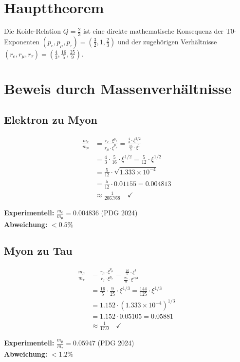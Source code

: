 	\section{Haupttheorem}
	
	\begin{theorem}
		Die Koide-Relation $Q = \frac{2}{3}$ ist eine direkte mathematische Konsequenz der T0-Exponenten $(p_e, p_\mu, p_\tau) = \left(\frac{3}{2}, 1, \frac{2}{3}\right)$ und der zugehörigen Verhältnisse $(r_e, r_\mu, r_\tau) = \left(\frac{4}{3}, \frac{16}{5}, \frac{25}{9}\right)$.
	\end{theorem}
	
	\section{Beweis durch Massenverhältnisse}
	
	\subsection{Elektron zu Myon}
	
	\begin{beweis}
		\allowdisplaybreaks
		\begin{align}
			\frac{m_e}{m_\mu} &= \frac{r_e \cdot \xi^{p_e}}{r_\mu \cdot \xi^{p_\mu}} = \frac{\frac{4}{3} \cdot \xi^{3/2}}{\frac{16}{5} \cdot \xi^1} \\
			&= \frac{4}{3} \cdot \frac{5}{16} \cdot \xi^{1/2} = \frac{5}{12} \cdot \xi^{1/2} \\
			&= \frac{5}{12} \cdot \sqrt{1.333 \times 10^{-4}} \\
			&= \frac{5}{12} \cdot 0.01155 = 0.004813 \\
			&\approx \frac{1}{206.768} \quad \checkmark
		\end{align}
		
		\textbf{Experimentell:} $\frac{m_e}{m_\mu} = 0.004836$ (PDG 2024)\\
		\textbf{Abweichung:} $< 0.5\%$
	\end{beweis}
	
	\subsection{Myon zu Tau}
	
	\begin{beweis}
		\begin{align}
			\frac{m_\mu}{m_\tau} &= \frac{r_\mu \cdot \xi^{p_\mu}}{r_\tau \cdot \xi^{p_\tau}} = \frac{\frac{16}{5} \cdot \xi^1}{\frac{25}{9} \cdot \xi^{2/3}} \\
			&= \frac{16}{5} \cdot \frac{9}{25} \cdot \xi^{1/3} = \frac{144}{125} \cdot \xi^{1/3} \\
			&= 1.152 \cdot (1.333 \times 10^{-4})^{1/3} \\
			&= 1.152 \cdot 0.05105 = 0.05881 \\
			&\approx \frac{1}{17.0} \quad \checkmark
		\end{align}
		
		\textbf{Experimentell:} $\frac{m_\mu}{m_\tau} = 0.05947$ (PDG 2024)\\
		\textbf{Abweichung:} $< 1.2\%$
	\end{beweis}
	
